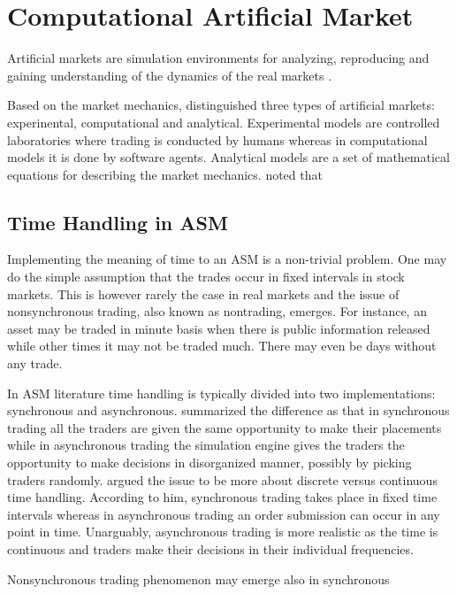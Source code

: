 \section{Computational Artificial Market}
Artificial markets are simulation environments for analyzing, 
reproducing and gaining understanding of the dynamics of the 
real markets \citet{Julien07}. 

Based on the market mechanics, \citet{boer05} distinguished 
three types of artificial markets: experinental, computational and analytical. 
Experimental models are controlled laboratories 
where trading is conducted by humans whereas in computational
models it is done by software agents. Analytical models are a
set of mathematical equations for describing the market
mechanics. \citet{boer05} noted that 

\subsection{Time Handling in ASM}

Implementing the meaning of time to an ASM is a non-trivial problem.
One may do the simple assumption that the trades occur in fixed
intervals in stock markets. This is however rarely the case in real markets
and the issue of nonsynchronous trading, also known as nontrading, emerges. 
For instance, an asset may be traded in minute basis when there is
public information released while other times it may not be traded much.
There may even be days without any trade. \citep{Econometrics} 

In ASM literature time handling is typically divided into two implementations:
synchronous and asynchronous. \citet{Julien07} summarized the difference as that in synchronous
trading all the traders are given the same opportunity to make their placements
while in asynchronous trading the simulation engine gives the traders the opportunity to
make decisions in disorganized manner, possibly by picking traders randomly.
\citet{Ben17} argued the issue to be more about discrete versus continuous time handling.
According to him, synchronous trading takes place in fixed time intervals whereas in 
asynchronous trading an order submission can occur in any point in time. Unarguably, 
asynchronous trading is more realistic as the time is continuous and traders make
their decisions in their individual frequencies.

Nonsynchronous trading phenomenon may emerge also in synchronous

